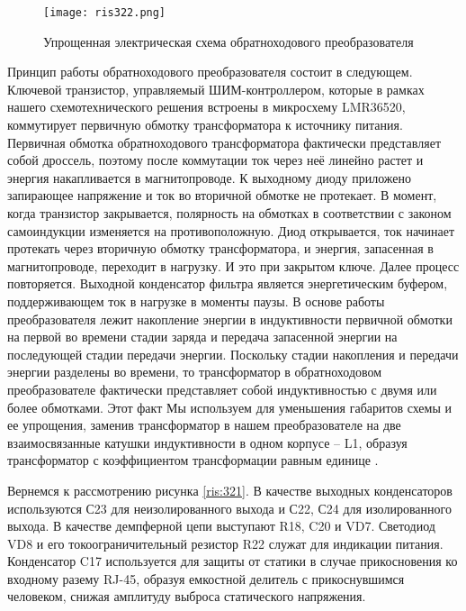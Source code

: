 \begin{figure}[H]
    \centering
    \texttt{[image: ris322.png]}
    \caption{Упрощенная электрическая схема обратноходового преобразователя}
    \label{ris:322}
\end{figure}

Принцип работы обратноходового преобразователя состоит в следующем. Ключевой транзистор, 
управляемый ШИМ-контроллером, которые в рамках нашего схемотехнического решения встроены
в микросхему LMR36520, коммутирует первичную обмотку трансформатора к источнику питания.
Первичная обмотка обратноходового трансформатора фактически представляет собой дроссель, 
поэтому после коммутации ток через неё линейно растет и энергия накапливается в магнитопроводе. 
К выходному диоду приложено запирающее напряжение и ток во вторичной обмотке не протекает. 
В момент, когда транзистор закрывается, полярность на обмотках в соответствии с законом 
самоиндукции изменяется на противоположную. Диод открывается, ток начинает протекать через
вторичную обмотку трансформатора, и энергия, запасенная в магнитопроводе, переходит в нагрузку. 
И это при закрытом ключе. Далее процесс повторяется. Выходной конденсатор фильтра является 
энергетическим буфером, поддерживающем ток в нагрузке в моменты паузы.
В основе работы преобразователя лежит накопление энергии в индуктивности первичной обмотки 
на первой во времени стадии заряда и передача запасенной энергии на последующей стадии 
передачи энергии. Поскольку стадии накопления и передачи энергии разделены во времени, 
то трансформатор в обратноходовом преобразователе фактически представляет собой индуктивностью 
с двумя или более обмотками. Этот факт Мы используем для уменьшения габаритов схемы и ее упрощения,
заменив трансформатор в нашем преобразователе на две взаимосвязанные катушки индуктивности в 
одном корпусе -- L1, образуя трансформатор с коэффициентом трансформации равным единице
\cite{PowerElectronic:FlyBack} 
\cite{Würth Elektronik:Application Note}
\cite{DC-DC_Book:Recom}.

Вернемся к рассмотрению рисунка \ref{ris:321}. В качестве выходных конденсаторов используются
С23 для неизолированного выхода и С22, С24 для изолированного выхода. В качестве демпферной цепи 
выступают R18, C20 и VD7. Светодиод VD8 и его токоограничительный резистор R22 служат для 
индикации питания. Конденсатор C17 используется для защиты от статики в случае прикосновения ко 
входному разему RJ-45, образуя емкостной делитель с прикоснувшимся человеком, снижая амплитуду 
выброса статического напряжения. 

